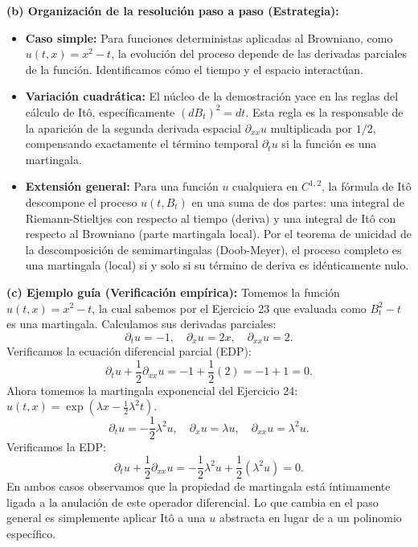 \documentclass[11pt, letterpaper]{article}
\begin{document}
\begin{solucion}
    \textbf{(b) Organización de la resolución paso a paso (Estrategia):}
    \begin{itemize}
        \item[(i)] \textbf{Caso simple:} Para funciones deterministas aplicadas al Browniano, como $u(t,x) = x^2 - t$, la evolución del proceso depende de las derivadas parciales de la función. Identificamos cómo el tiempo y el espacio interactúan.
        \item[(ii)] \textbf{Variación cuadrática:} El núcleo de la demostración yace en las reglas del cálculo de Itô, específicamente $(dB_t)^2 = dt$. Esta regla es la responsable de la aparición de la segunda derivada espacial $\partial_{xx}u$ multiplicada por $1/2$, compensando exactamente el término temporal $\partial_t u$ si la función es una martingala.
        \item[(iii)] \textbf{Extensión general:} Para una función $u$ cualquiera en $C^{1,2}$, la fórmula de Itô descompone el proceso $u(t, B_t)$ en una suma de dos partes: una integral de Riemann-Stieltjes con respecto al tiempo (deriva) y una integral de Itô con respecto al Browniano (parte martingala local). Por el teorema de unicidad de la descomposición de semimartingalas (Doob-Meyer), el proceso completo es una martingala (local) si y solo si su término de deriva es idénticamente nulo.
    \end{itemize}

    \vspace{3mm}
    \textbf{(c) Ejemplo guía (Verificación empírica):}
    Tomemos la función $u(t,x) = x^2 - t$, la cual sabemos por el Ejercicio 23 que evaluada como $B_t^2 - t$ es una martingala. 
    Calculamos sus derivadas parciales:
    \[ \partial_t u = -1, \quad \partial_x u = 2x, \quad \partial_{xx} u = 2. \]
    Verificamos la ecuación diferencial parcial (EDP):
    \[ \partial_t u + \frac{1}{2}\partial_{xx} u = -1 + \frac{1}{2}(2) = -1 + 1 = 0. \]
    Ahora tomemos la martingala exponencial del Ejercicio 24: $u(t,x) = \exp(\lambda x - \frac{1}{2}\lambda^2 t)$.
    \[ \partial_t u = -\frac{1}{2}\lambda^2 u, \quad \partial_x u = \lambda u, \quad \partial_{xx} u = \lambda^2 u. \]
    Verificamos la EDP:
    \[ \partial_t u + \frac{1}{2}\partial_{xx} u = -\frac{1}{2}\lambda^2 u + \frac{1}{2}(\lambda^2 u) = 0. \]
    En ambos casos observamos que la propiedad de martingala está íntimamente ligada a la anulación de este operador diferencial. Lo que cambia en el paso general es simplemente aplicar Itô a una $u$ abstracta en lugar de a un polinomio específico.


\end{solucion}
\end{document}
